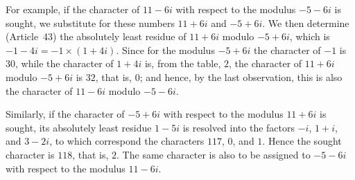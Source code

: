 \documentclass[12pt]{article}
\begin{document}
For example, if the character of $11-6i$ with respect to the modulus $-5-6i$ is sought, we substitute for these numbers $11+6i$ and $-5+6i$. We then determine (Article~43) the absolutely least residue of $11+6i$ modulo $-5+6i$, which is $-1-4i=-1\times(1+4i)$. Since for the modulus $-5+6i$ the character of $-1$ is $30$, while the character of $1+4i$ is, from the table, $2$, the character of $11+6i$ modulo $-5+6i$ is $32$, that is, $0$; and hence, by the last observation, this is also the character of $11-6i$ modulo $-5-6i$.

Similarly, if the character of $-5+6i$ with respect to the modulus $11+6i$ is sought, its absolutely least residue $1-5i$ is resolved into the factors $-i$, $1+i$, and $3-2i$, to which correspond the characters $117$, $0$, and $1$. Hence the sought character is $118$, that is, $2$. The same character is also to be assigned to $-5-6i$ with respect to the modulus $11-6i$.
\end{document}

